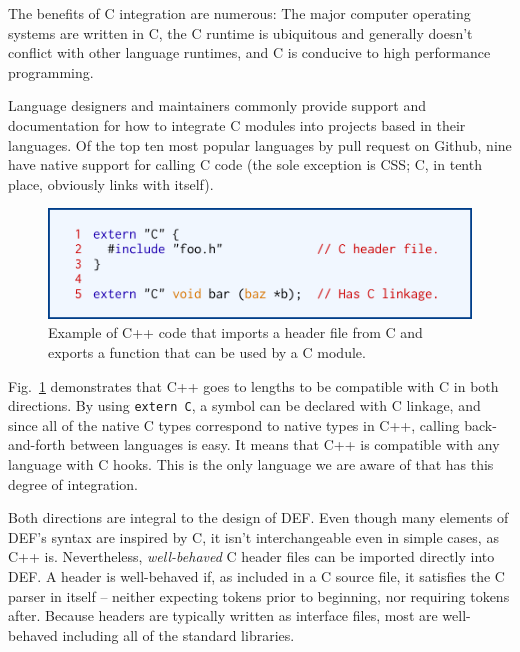The benefits of C integration are numerous: The major computer operating systems are written in C,\cite{Linux, Darwin, WindowsKernel} the C runtime is ubiquitous and generally doesn't conflict with other language runtimes, and C is conducive to high performance programming.

Language designers and maintainers commonly provide support and documentation for how to integrate C modules into projects based in their languages.  Of the top ten most popular languages by pull request on Github,\cite{Octoverse} nine have native support for calling C code\cite{JavascriptCiface, PythonCiface, JavaCiface, RubyCiface, PHPCiface, DotNetCiface, GoCiface, CPPCIface} (the sole exception is CSS; C, in tenth place, obviously links with itself).

\begin{figure}[htbp!]
        \centering
        \includegraphics[scale=0.25]{gfx/extern}
        \caption{Example of C++ code that imports a header file from C and exports a function that can be used by a C module.}
        \label{fig:extern-example}
\end{figure}

Fig.~\ref{fig:extern-example} demonstrates that C++ goes to lengths to be compatible with C in both directions.  By using \texttt{extern \textquotedbl{}C\textquotedbl{}}, a symbol can be declared with C linkage, and since all of the native C types correspond to native types in C++, calling back-and-forth between languages is easy.  It means that C++ is compatible with any language with C hooks.  This is the only language we are aware of that has this degree of integration.

Both directions are integral to the design of DEF.  Even though many elements of DEF's syntax are inspired by C, it isn't interchangeable even in simple cases, as C++ is.  Nevertheless, \textit{well-behaved} C header files can be imported directly into DEF.  A header is well-behaved if, as included in a C source file, it satisfies the C parser in itself -- neither expecting tokens prior to beginning, nor requiring tokens after.  Because headers are typically written as interface files, most are well-behaved including all of the standard libraries.
